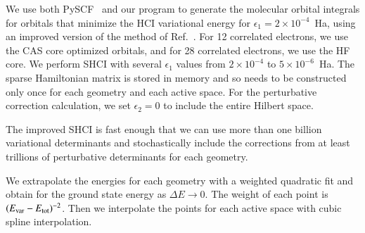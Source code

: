 We use both PySCF~\cite{SunCha_etal_PySCF-ComMolSci-18} and our program to generate the molecular orbital integrals for orbitals that minimize the HCI variational
energy for $\epsilon_1=2\times 10^{-4}$~Ha, using an improved version of the method of Ref.~\cite{SmiMusHolSha-JCTC-17}.
For 12 correlated electrons, we use the CAS core optimized orbitals, and for 28 correlated electrons, we use the HF core.
We perform SHCI with several $\epsilon_1$ values from $2\times10^{-4}$ to $5\times10^{-6}$~Ha.
The sparse Hamiltonian matrix is stored in memory and so needs to be constructed only once for each geometry and each active space.
For the perturbative correction calculation, we set $\epsilon_2 = 0$  to include the entire Hilbert space.

The improved SHCI is fast enough that we can use more than one billion variational determinants and stochastically include the corrections from at least trillions of perturbative determinants for each geometry.

We extrapolate the energies for each geometry with a weighted quadratic fit
and obtain for the ground state energy as $\Delta E\to0$.
The weight of each point is $(E_{\rm var} - E_{\rm tot})^{-2}$.
Then we interpolate the points for each active space with cubic spline interpolation.

